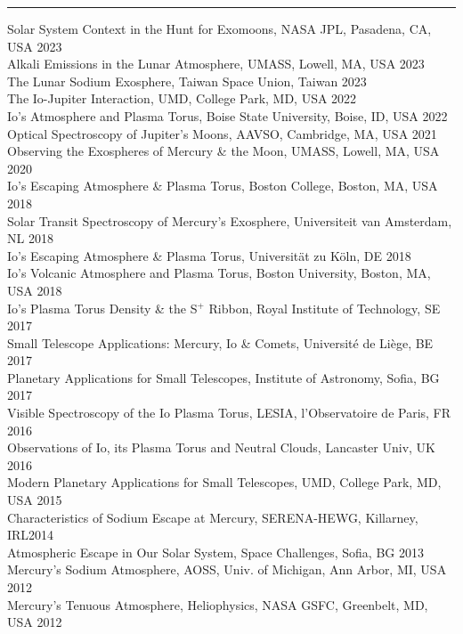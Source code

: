 \documentclass[12pt]{report}
\begin{document}
\rule{\textwidth}{1pt}
\noindent Solar System Context in the Hunt for Exomoons, NASA JPL, Pasadena, CA, USA \hfill 2023\\
\noindent Alkali Emissions in the Lunar Atmosphere, UMASS, Lowell, MA, USA \hfill 2023\\
\noindent The Lunar Sodium Exosphere, Taiwan Space Union, Taiwan \hfill 2023\\
\noindent The Io-Jupiter Interaction, UMD, College Park, MD, USA \hfill 2022\\
\noindent Io's Atmosphere and Plasma Torus, Boise State University, Boise, ID, USA \hfill 2022\\
\noindent Optical Spectroscopy of Jupiter's Moons, AAVSO, Cambridge, MA, USA \hfill 2021\\
\noindent Observing the Exospheres of Mercury \& the Moon, UMASS, Lowell, MA, USA \hfill 2020\\
\noindent Io's Escaping Atmosphere \& Plasma Torus, Boston College, Boston, MA, USA \hfill 2018\\
\noindent Solar Transit Spectroscopy of Mercury's Exosphere, Universiteit van Amsterdam, NL \hfill 2018\\
\noindent Io's Escaping Atmosphere \& Plasma Torus, Universit\"at zu K\"oln, DE \hfill 2018\\
\noindent Io's Volcanic Atmosphere and Plasma Torus, Boston University, Boston, MA, USA \hfill 2018\\
\noindent Io's Plasma Torus Density \& the S$^+$ Ribbon, Royal Institute of Technology, SE \hfill 2017\\
\noindent Small Telescope Applications: Mercury, Io \& Comets, Universit\'e de Li\`ege, BE \hfill 2017\\
\noindent Planetary Applications for Small Telescopes, Institute of Astronomy, Sofia, BG \hfill 2017\\
\noindent Visible Spectroscopy of the Io Plasma Torus, LESIA, l'Observatoire de Paris, FR \hfill 2016\\
\noindent Observations of Io, its Plasma Torus and Neutral Clouds, Lancaster Univ, UK \hfill 2016\\
\noindent Modern Planetary Applications for Small Telescopes, UMD, College Park, MD, USA \hfill 2015\\
\noindent Characteristics of Sodium Escape at Mercury, SERENA-HEWG, Killarney, IRL\hfill 2014\\
\noindent Atmospheric Escape in Our Solar System, Space Challenges, Sofia, BG \hfill 2013\\
\noindent Mercury's Sodium Atmosphere, AOSS, Univ. of Michigan, Ann Arbor, MI, USA \hfill 2012\\
\noindent Mercury's Tenuous Atmosphere, Heliophysics, NASA GSFC, Greenbelt, MD, USA \hfill 2012\\
\end{document}
